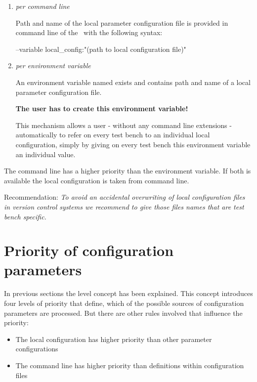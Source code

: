 \begin{enumerate}
   \item \textit{per command line}

         Path and name of the local parameter configuration file is provided in command line of the \rfwcore\ with the following syntax:
\begin{robotlog}
--variable local_config:"(path to local configuration file)"
\end{robotlog}

   \item \textit{per environment variable}

         An environment variable named  exists and contains path and name of a local parameter configuration file.

         \textbf{The user has to create this environment variable!}

         This mechanism allows a user - without any command line extensions - automatically to refer on every test bench to an individual local configuration,
         simply by giving on every test bench this environment variable an individual value.

\end{enumerate}

The command line has a higher priority than the environment variable. If both is available the local configuration is taken from command line.

Recommendation: \textit{To avoid an accidental overwriting of local configuration files in version control systems we recommend to give those files
names that are test bench specific.}

\newpage

\section{Priority of configuration parameters}

In previous sections the level concept has been explained. This concept introduces four levels of priority
that define, which of the possible sources of configuration parameters are processed.
But there are other rules involved that influence the priority:

\begin{itemize}
   \item The local configuration has higher priority than other parameter configurations
   \item The command line has higher priority than definitions within configuration files
\end{itemize}

